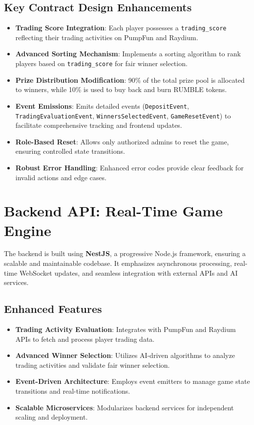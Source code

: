 \documentclass[11pt,a4paper]{article}
\begin{document}
\subsection{Key Contract Design Enhancements}

\begin{itemize}
    \item \textbf{Trading Score Integration}: Each player possesses a \texttt{trading\_score} reflecting their trading activities on PumpFun and Raydium.
    \item \textbf{Advanced Sorting Mechanism}: Implements a sorting algorithm to rank players based on \texttt{trading\_score} for fair winner selection.
    \item \textbf{Prize Distribution Modification}: 90\% of the total prize pool is allocated to winners, while 10\% is used to buy back and burn RUMBLE tokens.
    \item \textbf{Event Emissions}: Emits detailed events (\texttt{DepositEvent}, \texttt{TradingEvaluationEvent}, \texttt{WinnersSelectedEvent}, \texttt{GameResetEvent}) to facilitate comprehensive tracking and frontend updates.
    \item \textbf{Role-Based Reset}: Allows only authorized admins to reset the game, ensuring controlled state transitions.
    \item \textbf{Robust Error Handling}: Enhanced error codes provide clear feedback for invalid actions and edge cases.
\end{itemize}

\section{Backend API: Real-Time Game Engine}

The backend is built using \textbf{NestJS}, a progressive Node.js framework, ensuring a scalable and maintainable codebase. It emphasizes asynchronous processing, real-time WebSocket updates, and seamless integration with external APIs and AI services.

\subsection{Enhanced Features}

\begin{itemize}
    \item \textbf{Trading Activity Evaluation}: Integrates with PumpFun and Raydium APIs to fetch and process player trading data.
    \item \textbf{Advanced Winner Selection}: Utilizes AI-driven algorithms to analyze trading activities and validate fair winner selection.
    \item \textbf{Event-Driven Architecture}: Employs event emitters to manage game state transitions and real-time notifications.
    \item \textbf{Scalable Microservices}: Modularizes backend services for independent scaling and deployment.
\end{itemize}
\end{document}
